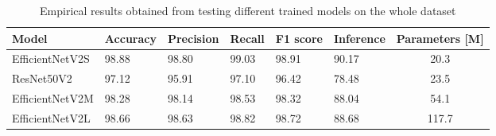 \documentclass[11pt]{article}
\begin{document}
\begin{multicols}{2}
        \begin{table}[t]
            \centering
            \setlength{\tabcolsep}{3pt}
            \caption{Empirical results obtained from testing different trained models on the whole dataset}
            \begin{tabularx}{\textwidth}{lYYYYYc}
                \toprule
                Model & Accuracy & Precision & Recall & F1 score & Inference & Parameters [M]\\
                \midrule
                EfficientNetV2S & 98.88 & 98.80 & 99.03 & 98.91 & 90.17 & 20.3\\
                ResNet50V2 & 97.12 & 95.91 & 97.10 & 96.42 & 78.48 & 23.5\\
                EfficientNetV2M & 98.28 & 98.14 & 98.53 & 98.32 & 88.04 & 54.1\\
                EfficientNetV2L & 98.66 & 98.63 & 98.82 & 98.72 & 88.68 & 117.7\\
                \bottomrule
                \end{tabularx}
            \label{tab:Performance}
        \end{table}


\end{multicols}
\end{document}
